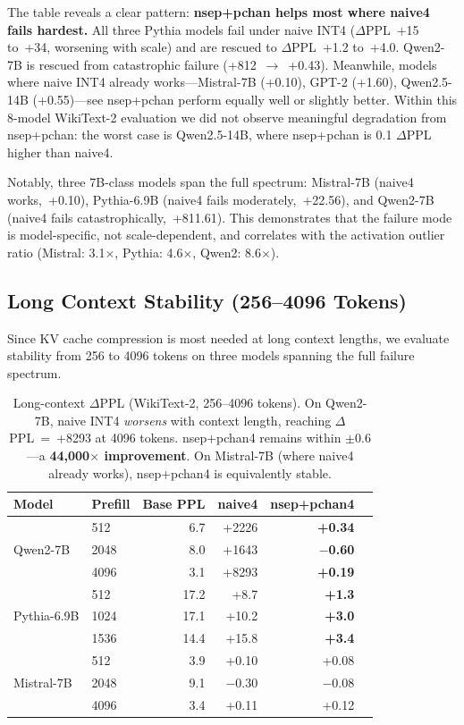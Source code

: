 \documentclass[11pt]{article}
\begin{document}
The table reveals a clear pattern: \textbf{nsep+pchan helps most where naive4 fails hardest.} All three Pythia models fail under naive INT4 ($\Delta$PPL~+15 to~+34, worsening with scale) and are rescued to $\Delta$PPL~+1.2 to~+4.0. Qwen2-7B is rescued from catastrophic failure (+812~$\to$~+0.43). Meanwhile, models where naive INT4 already works---Mistral-7B (+0.10), GPT-2 (+1.60), Qwen2.5-14B (+0.55)---see nsep+pchan perform equally well or slightly better. Within this 8-model WikiText-2 evaluation we did not observe meaningful degradation from nsep+pchan: the worst case is Qwen2.5-14B, where nsep+pchan is 0.1 $\Delta$PPL higher than naive4.

Notably, three 7B-class models span the full spectrum: Mistral-7B (naive4 works,~+0.10), Pythia-6.9B (naive4 fails moderately,~+22.56), and Qwen2-7B (naive4 fails catastrophically,~+811.61). This demonstrates that the failure mode is model-specific, not scale-dependent, and correlates with the activation outlier ratio (Mistral: 3.1$\times$, Pythia: 4.6$\times$, Qwen2: 8.6$\times$).

\subsection{Long Context Stability (256--4096 Tokens)}

Since KV cache compression is most needed at long context lengths, we evaluate stability from 256 to 4096 tokens on three models spanning the full failure spectrum.

\begin{table}[h]
\centering
\small
\begin{tabular}{llrrrr}
\toprule
Model & Prefill & Base PPL & naive4 & nsep+pchan4 \\
\midrule
\multirow{3}{*}{Qwen2-7B} & 512 & 6.7 & +2226 & \textbf{+0.34} \\
& 2048 & 8.0 & +1643 & \textbf{$-$0.60} \\
& 4096 & 3.1 & +8293 & \textbf{+0.19} \\
\midrule
\multirow{3}{*}{Pythia-6.9B} & 512 & 17.2 & +8.7 & \textbf{+1.3} \\
& 1024 & 17.1 & +10.2 & \textbf{+3.0} \\
& 1536 & 14.4 & +15.8 & \textbf{+3.4} \\
\midrule
\multirow{3}{*}{Mistral-7B} & 512 & 3.9 & +0.10 & +0.08 \\
& 2048 & 9.1 & $-$0.30 & $-$0.08 \\
& 4096 & 3.4 & +0.11 & +0.12 \\
\bottomrule
\end{tabular}
\caption{Long-context $\Delta$PPL (WikiText-2, 256--4096 tokens). On Qwen2-7B, naive INT4 \emph{worsens} with context length, reaching $\Delta$PPL~=~+8293 at 4096 tokens. nsep+pchan4 remains within $\pm$0.6---a \textbf{44{,}000$\times$ improvement}. On Mistral-7B (where naive4 already works), nsep+pchan4 is equivalently stable.}
\label{tab:longctx_main}
\end{table}
\end{document}
